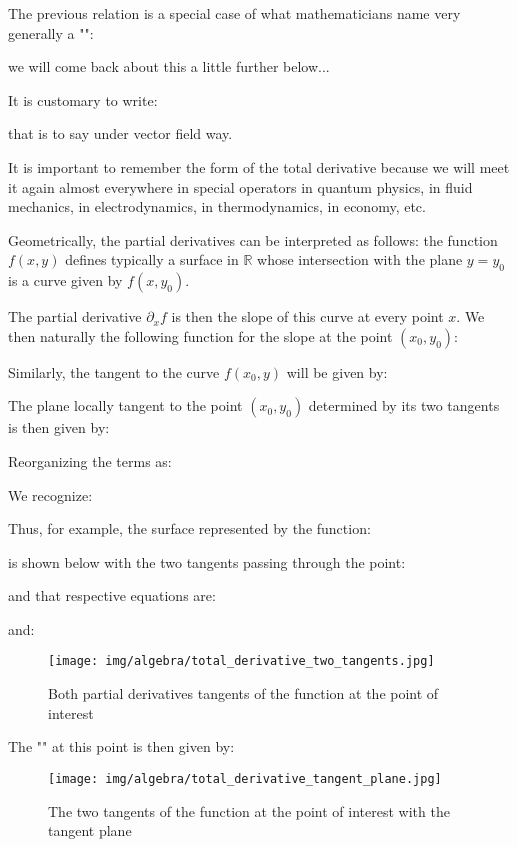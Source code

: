 	The previous relation is a special case of what mathematicians name very generally a "":
	
	we will come back about this a little further below... 
	
	It is customary to write:
	
	that is to say under vector field way.
	
	It is important to remember the form of the total derivative because we will meet it again almost everywhere in special operators in quantum physics, in fluid mechanics, in electrodynamics, in thermodynamics, in economy, etc.
	
	Geometrically, the partial derivatives can be interpreted as follows: the function $f(x, y)$ defines typically a surface in $\mathbb{R}$ whose intersection with the plane $y=y_0$ is a curve given by $f(x,y_0)$.
	
	The partial derivative $\partial_x f$ is then the slope of this curve at every point $x$. We then naturally the following function for the slope at the point $(x_0,y_0)$:
	
	Similarly, the tangent to the curve $f(x_0,y)$ will be given by:
	
	The plane locally tangent to the point $(x_0,y_0)$ determined by its two tangents is then given by:
	
	Reorganizing the terms as:
	
	We recognize:
	
	Thus, for example, the surface represented by the function:
	
	is shown below with the two tangents passing through the point:
	
	and that respective equations are:
	
	and:
	
	\begin{figure}[H]
	\centering
	\texttt{[image: img/algebra/total\_derivative\_two\_tangents.jpg]}
	\caption{Both partial derivatives tangents of the function at the point of interest}
	\end{figure}
	The "" at this point is then given by:
		
	\begin{figure}[H]
		\centering
		\texttt{[image: img/algebra/total\_derivative\_tangent\_plane.jpg]}
		\caption[]{The two tangents of the function at the point of interest with the tangent plane}
	\end{figure}
	
